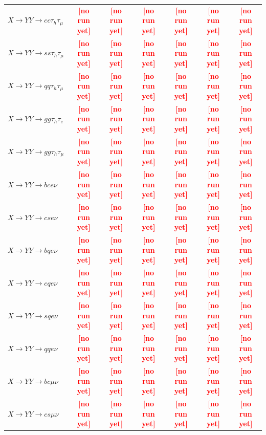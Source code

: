 \documentclass[12pt]{article}   %
\newcommand{\pending}[1]{\textcolor{red}{\textbf{[#1]}}}
\begin{document}
\begin{landscape}
{\begin{longtable}{@{\extracolsep{\fill}}lcccccc@{}}
$X\to YY\to cc\tau_h\tau_\mu$ & \pending{no run yet} & \pending{no run yet} & \pending{no run yet} & \pending{no run yet} & \pending{no run yet} & \pending{no run yet} \\
$X\to YY\to ss\tau_h\tau_\mu$ & \pending{no run yet} & \pending{no run yet} & \pending{no run yet} & \pending{no run yet} & \pending{no run yet} & \pending{no run yet} \\
$X\to YY\to qq\tau_h\tau_\mu$ & \pending{no run yet} & \pending{no run yet} & \pending{no run yet} & \pending{no run yet} & \pending{no run yet} & \pending{no run yet} \\
$X\to YY\to gg\tau_h\tau_e$ & \pending{no run yet} & \pending{no run yet} & \pending{no run yet} & \pending{no run yet} & \pending{no run yet} & \pending{no run yet} \\
$X\to YY\to gg\tau_h\tau_\mu$ & \pending{no run yet} & \pending{no run yet} & \pending{no run yet} & \pending{no run yet} & \pending{no run yet} & \pending{no run yet} \\
\midrule
$X\to YY\to bce\nu$ & \pending{no run yet} & \pending{no run yet} & \pending{no run yet} & \pending{no run yet} & \pending{no run yet} & \pending{no run yet} \\
$X\to YY\to cse\nu$ & \pending{no run yet} & \pending{no run yet} & \pending{no run yet} & \pending{no run yet} & \pending{no run yet} & \pending{no run yet} \\
$X\to YY\to bqe\nu$ & \pending{no run yet} & \pending{no run yet} & \pending{no run yet} & \pending{no run yet} & \pending{no run yet} & \pending{no run yet} \\
$X\to YY\to cqe\nu$ & \pending{no run yet} & \pending{no run yet} & \pending{no run yet} & \pending{no run yet} & \pending{no run yet} & \pending{no run yet} \\
$X\to YY\to sqe\nu$ & \pending{no run yet} & \pending{no run yet} & \pending{no run yet} & \pending{no run yet} & \pending{no run yet} & \pending{no run yet} \\
$X\to YY\to qqe\nu$ & \pending{no run yet} & \pending{no run yet} & \pending{no run yet} & \pending{no run yet} & \pending{no run yet} & \pending{no run yet} \\
$X\to YY\to bc\mu\nu$ & \pending{no run yet} & \pending{no run yet} & \pending{no run yet} & \pending{no run yet} & \pending{no run yet} & \pending{no run yet} \\
$X\to YY\to cs\mu\nu$ & \pending{no run yet} & \pending{no run yet} & \pending{no run yet} & \pending{no run yet} & \pending{no run yet} & \pending{no run yet} \\

\end{longtable}}
\end{landscape}
\end{document}
